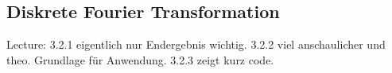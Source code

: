 \subsection{Diskrete Fourier Transformation}

Lecture: 3.2.1 eigentlich nur Endergebnis wichtig. 3.2.2 viel anschaulicher und theo. Grundlage für Anwendung. 3.2.3 zeigt kurz code.
